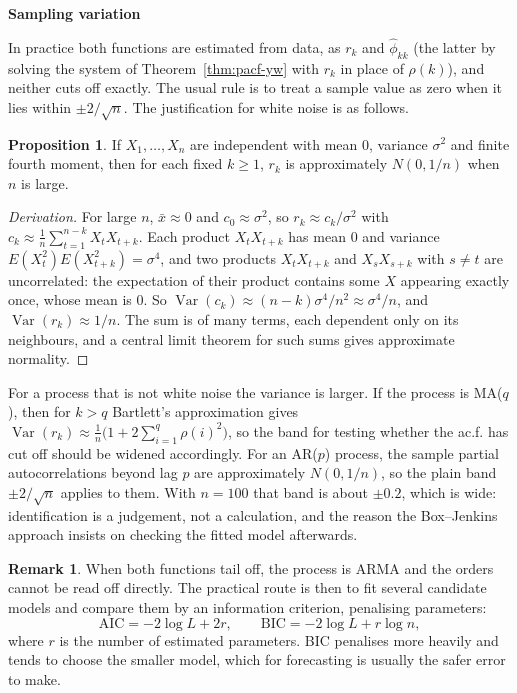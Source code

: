 \documentclass[11pt,a4paper]{article}
\theoremstyle{definition}
\newtheorem{prop}[thm]{Proposition}
\newtheorem*{remark}{Remark}
\newcommand{\subhead}[1]{%
  \par\medskip\noindent\textbf{#1}\par\nobreak\smallskip}
\DeclareMathOperator{\Var}{Var}
\begin{document}
\subhead{Sampling variation}
In practice both functions are estimated from data, as $r_k$ and $\hat\phi_{kk}$ (the latter by solving the system of
Theorem~\ref{thm:pacf-yw} with $r_k$ in place of $\rho(k)$), and neither cuts off exactly. The usual rule is to treat a sample value as
zero when it lies within $\pm2/\sqrt n$. The justification for white noise is as follows.

\begin{prop}\label{prop:rk-white-noise}
If $X_1, \dots, X_n$ are independent with mean $0$, variance $\sigma^2$ and finite fourth moment, then for each fixed $k \ge 1$, $r_k$ is
approximately $N(0, 1/n)$ when $n$ is large.
\end{prop}

\begin{proof}[Derivation]
For large $n$, $\bar x \approx 0$ and $c_0 \approx \sigma^2$, so $r_k \approx c_k/\sigma^2$ with $c_k \approx \frac1n\sum_{t=1}^{n-k}X_tX_{t+k}$. Each product $X_tX_{t+k}$ has mean $0$ and variance
$E(X_t^2)E(X_{t+k}^2) = \sigma^4$, and two products $X_tX_{t+k}$ and $X_sX_{s+k}$ with $s \ne t$ are uncorrelated: the expectation of their product
contains some $X$ appearing exactly once, whose mean is $0$. So $\Var(c_k) \approx (n - k)\sigma^4/n^2 \approx \sigma^4/n$, and $\Var(r_k) \approx 1/n$. The sum is
of many terms, each dependent only on its neighbours, and a central limit theorem for such sums gives
approximate normality.
\end{proof}

For a process that is not white noise the variance is larger. If the process is MA($q$), then for $k > q$ Bartlett's
approximation gives $\Var(r_k) \approx \frac1n\bigl(1 + 2\sum_{i=1}^q\rho(i)^2\bigr)$, so the band for testing whether the ac.f. has cut off should be widened
accordingly. For an AR($p$) process, the sample partial autocorrelations beyond lag $p$ are approximately $N(0, 1/n)$, so the
plain band $\pm2/\sqrt n$ applies to them. With $n = 100$ that band is about $\pm0.2$, which is wide: identification is a
judgement, not a calculation, and the reason the Box--Jenkins approach insists on checking the fitted model
afterwards.

\begin{remark}
When both functions tail off, the process is ARMA and the orders cannot be read off directly. The practical
route is then to fit several candidate models and compare them by an information criterion, penalising
parameters:
\[
\text{AIC} = -2\log L + 2r , \qquad \text{BIC} = -2\log L + r\log n ,
\]
where $r$ is the number of estimated parameters. BIC penalises more heavily and tends to choose the smaller
model, which for forecasting is usually the safer error to make.
\end{remark}
\end{document}
